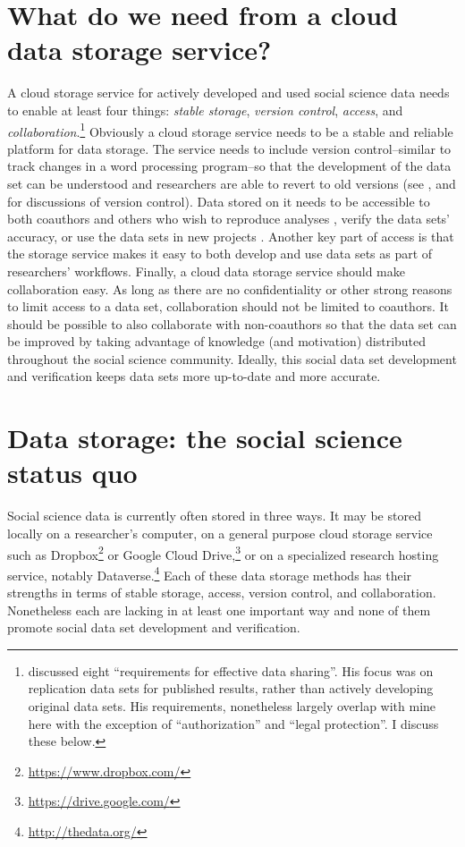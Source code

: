 \documentclass[twocolumn]{article}\usepackage{graphicx, color}
\begin{document}
\section{What do we need from a cloud data storage service?}

A cloud storage service for actively developed and used social science data needs to enable at least four things: \emph{stable storage}, \emph{version control}, \emph{access}, and \emph{collaboration}.\footnote{\cite{King2007} discussed eight ``requirements for effective data sharing''. His focus was on replication data sets for published results, rather than actively developing original data sets. His requirements, nonetheless largely overlap with mine here with the exception of ``authorization'' and ``legal protection''. I discuss these below.} Obviously a cloud storage service needs to be a stable and reliable platform for data storage. The service needs to include version control--similar to track changes in a word processing program--so that the development of the data set can be understood and researchers are able to revert to old versions (see \cite{Bowers2011}, \cite{Healey2011} and \cite{Fredrickson2011} for discussions of version control).  Data stored on it needs to be accessible to both coauthors and others who wish to reproduce analyses \citep{Fomel2009}, verify the data sets' accuracy, or use the data sets in new projects \citep{Kelly2006,King1995}. Another key part of access is that the storage service makes it easy to both develop and use data sets as part of researchers' workflows. Finally, a cloud data storage service should make collaboration easy. As long as there are no confidentiality or other strong reasons to limit access to a data set, collaboration should not be limited to coauthors. It should be possible to also collaborate with non-coauthors so that the data set can be improved by taking advantage of knowledge (and motivation) distributed throughout the social science community. Ideally, this social data set development and verification keeps data sets more up-to-date and more accurate. 

\section{Data storage: the social science status quo}

Social science data is currently often stored in three ways. It may be stored locally on a researcher's computer, on a general purpose cloud storage service such as Dropbox\footnote{\url{https://www.dropbox.com/}} or Google Cloud Drive,\footnote{\url{https://drive.google.com/}} or on a specialized research hosting service, notably Dataverse.\footnote{\url{http://thedata.org/}} Each of these data storage methods has their strengths in terms of stable storage, access, version control, and collaboration. Nonetheless each are lacking in at least one important way and none of them promote social data set development and verification.
\end{document}
